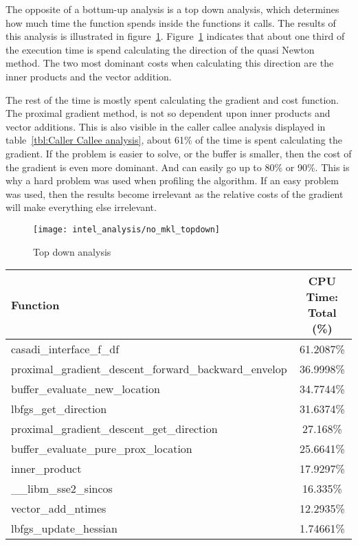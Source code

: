 The opposite of a bottum-up  analysis is a top down analysis, which determines how  much time the  function spends inside the functions it calls. The results of this analysis is illustrated in figure~\ref{fig:no mkl top down}. Figure~\ref{fig:no mkl top down} indicates that about one third of the execution time is spend calculating the direction of the quasi Newton method. The two most dominant costs when calculating this direction are the inner products and the vector addition.

The rest of the time is mostly spent calculating the gradient and cost function. The proximal gradient method, is not so dependent upon inner products and vector additions. This is also visible in the caller callee analysis displayed in table~\ref{tbl:Caller Callee analysis}, about 61\% of the time is spent calculating the gradient. If the problem is easier to solve, or the buffer is smaller, then the cost of the gradient is even more dominant. And can easily go up to 80\% or 90\%. This is why a hard problem was used when profiling the algorithm. If an easy problem was used, then the results become irrelevant as the relative costs of the gradient will make everything else irrelevant.

\begin{figure}[H]
	\centering
	\texttt{[image: intel\_analysis/no\_mkl\_topdown]}
	\caption{Top down analysis}
	\label{fig:no mkl top down}
\end{figure}

\begin{center}
	\begin{tabular}{| l | c |}
		\hline
		Function&CPU Time: Total (\%) \\
		\hline
		casadi\_interface\_f\_df&61.2087\% \\
		proximal\_gradient\_descent\_forward\_backward\_envelop&36.9998\% \\
		buffer\_evaluate\_new\_location&34.7744\% \\
		lbfgs\_get\_direction&31.6374\% \\
		proximal\_gradient\_descent\_get\_direction&27.168\% \\
		buffer\_evaluate\_pure\_prox\_location&25.6641\% \\
		inner\_product&17.9297\% \\
		\_\_libm\_sse2\_sincos&16.335\% \\
		vector\_add\_ntimes&12.2935\% \\
		lbfgs\_update\_hessian&1.74661\% \\
		\hline
	\end{tabular}
	\label{tbl:Caller Callee analysis}
\end{center}

